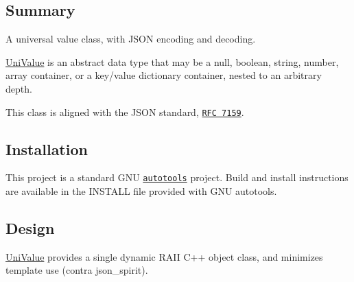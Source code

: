 \subsection*{Summary}

A universal value class, with J\+S\+ON encoding and decoding.

\mbox{\hyperlink{class_uni_value}{Uni\+Value}} is an abstract data type that may be a null, boolean, string, number, array container, or a key/value dictionary container, nested to an arbitrary depth.

This class is aligned with the J\+S\+ON standard, \href{https://tools.ietf.org/html/rfc7159.html}{\tt R\+FC 7159}.

\subsection*{Installation}

This project is a standard G\+NU \href{https://www.gnu.org/software/automake/manual/html_node/Autotools-Introduction.html}{\tt autotools} project. Build and install instructions are available in the {\ttfamily I\+N\+S\+T\+A\+LL} file provided with G\+NU autotools.




\subsection*{Design}

\mbox{\hyperlink{class_uni_value}{Uni\+Value}} provides a single dynamic R\+A\+II C++ object class, and minimizes template use (contra json\+\_\+spirit). 